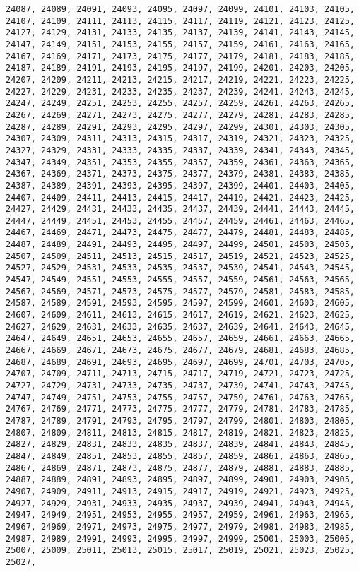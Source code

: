 \documentclass[11pt]{article}
\begin{document}
\begin{Verbatim}[commandchars=\\\{\}]
24087, 24089, 24091, 24093, 24095, 24097, 24099, 24101, 24103, 24105, 24107, 24109, 24111, 24113, 24115, 24117, 24119, 24121, 24123, 24125, 24127, 24129, 24131, 24133, 24135, 24137, 24139, 24141, 24143, 24145, 24147, 24149, 24151, 24153, 24155, 24157, 24159, 24161, 24163, 24165, 24167, 24169, 24171, 24173, 24175, 24177, 24179, 24181, 24183, 24185, 24187, 24189, 24191, 24193, 24195, 24197, 24199, 24201, 24203, 24205, 24207, 24209, 24211, 24213, 24215, 24217, 24219, 24221, 24223, 24225, 24227, 24229, 24231, 24233, 24235, 24237, 24239, 24241, 24243, 24245, 24247, 24249, 24251, 24253, 24255, 24257, 24259, 24261, 24263, 24265, 24267, 24269, 24271, 24273, 24275, 24277, 24279, 24281, 24283, 24285, 24287, 24289, 24291, 24293, 24295, 24297, 24299, 24301, 24303, 24305, 24307, 24309, 24311, 24313, 24315, 24317, 24319, 24321, 24323, 24325, 24327, 24329, 24331, 24333, 24335, 24337, 24339, 24341, 24343, 24345, 24347, 24349, 24351, 24353, 24355, 24357, 24359, 24361, 24363, 24365, 24367, 24369, 24371, 24373, 24375, 24377, 24379, 24381, 24383, 24385, 24387, 24389, 24391, 24393, 24395, 24397, 24399, 24401, 24403, 24405, 24407, 24409, 24411, 24413, 24415, 24417, 24419, 24421, 24423, 24425, 24427, 24429, 24431, 24433, 24435, 24437, 24439, 24441, 24443, 24445, 24447, 24449, 24451, 24453, 24455, 24457, 24459, 24461, 24463, 24465, 24467, 24469, 24471, 24473, 24475, 24477, 24479, 24481, 24483, 24485, 24487, 24489, 24491, 24493, 24495, 24497, 24499, 24501, 24503, 24505, 24507, 24509, 24511, 24513, 24515, 24517, 24519, 24521, 24523, 24525, 24527, 24529, 24531, 24533, 24535, 24537, 24539, 24541, 24543, 24545, 24547, 24549, 24551, 24553, 24555, 24557, 24559, 24561, 24563, 24565, 24567, 24569, 24571, 24573, 24575, 24577, 24579, 24581, 24583, 24585, 24587, 24589, 24591, 24593, 24595, 24597, 24599, 24601, 24603, 24605, 24607, 24609, 24611, 24613, 24615, 24617, 24619, 24621, 24623, 24625, 24627, 24629, 24631, 24633, 24635, 24637, 24639, 24641, 24643, 24645, 24647, 24649, 24651, 24653, 24655, 24657, 24659, 24661, 24663, 24665, 24667, 24669, 24671, 24673, 24675, 24677, 24679, 24681, 24683, 24685, 24687, 24689, 24691, 24693, 24695, 24697, 24699, 24701, 24703, 24705, 24707, 24709, 24711, 24713, 24715, 24717, 24719, 24721, 24723, 24725, 24727, 24729, 24731, 24733, 24735, 24737, 24739, 24741, 24743, 24745, 24747, 24749, 24751, 24753, 24755, 24757, 24759, 24761, 24763, 24765, 24767, 24769, 24771, 24773, 24775, 24777, 24779, 24781, 24783, 24785, 24787, 24789, 24791, 24793, 24795, 24797, 24799, 24801, 24803, 24805, 24807, 24809, 24811, 24813, 24815, 24817, 24819, 24821, 24823, 24825, 24827, 24829, 24831, 24833, 24835, 24837, 24839, 24841, 24843, 24845, 24847, 24849, 24851, 24853, 24855, 24857, 24859, 24861, 24863, 24865, 24867, 24869, 24871, 24873, 24875, 24877, 24879, 24881, 24883, 24885, 24887, 24889, 24891, 24893, 24895, 24897, 24899, 24901, 24903, 24905, 24907, 24909, 24911, 24913, 24915, 24917, 24919, 24921, 24923, 24925, 24927, 24929, 24931, 24933, 24935, 24937, 24939, 24941, 24943, 24945, 24947, 24949, 24951, 24953, 24955, 24957, 24959, 24961, 24963, 24965, 24967, 24969, 24971, 24973, 24975, 24977, 24979, 24981, 24983, 24985, 24987, 24989, 24991, 24993, 24995, 24997, 24999, 25001, 25003, 25005, 25007, 25009, 25011, 25013, 25015, 25017, 25019, 25021, 25023, 25025, 25027, 
\end{Verbatim}
\end{document}
